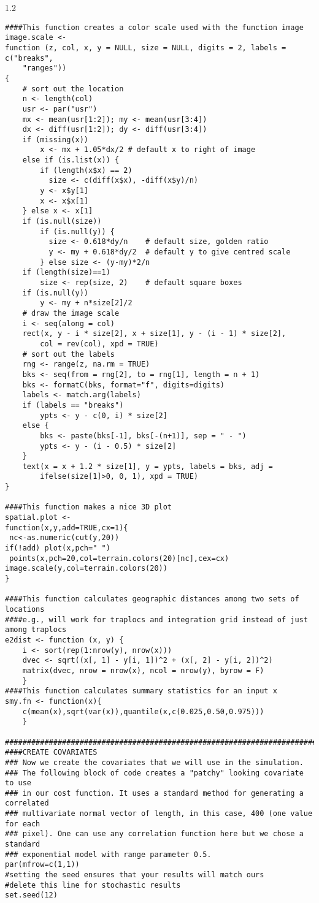 \documentclass[12pt]{article}
\begin{document}
\begin{spacing}{1.2}
{\begin{verbatim}
####This function creates a color scale used with the function image
image.scale <-
function (z, col, x, y = NULL, size = NULL, digits = 2, labels = c("breaks", 
    "ranges"))
{
    # sort out the location
    n <- length(col)
    usr <- par("usr")
    mx <- mean(usr[1:2]); my <- mean(usr[3:4])
    dx <- diff(usr[1:2]); dy <- diff(usr[3:4])
    if (missing(x))
        x <- mx + 1.05*dx/2	# default x to right of image
    else if (is.list(x)) {
        if (length(x$x) == 2) 
          size <- c(diff(x$x), -diff(x$y)/n)
        y <- x$y[1]
        x <- x$x[1]
    } else x <- x[1]
    if (is.null(size))
        if (is.null(y)) {
          size <- 0.618*dy/n	# default size, golden ratio
          y <- my + 0.618*dy/2	# default y to give centred scale
        } else size <- (y-my)*2/n
    if (length(size)==1)
        size <- rep(size, 2)	# default square boxes
    if (is.null(y))
        y <- my + n*size[2]/2
    # draw the image scale
    i <- seq(along = col)
    rect(x, y - i * size[2], x + size[1], y - (i - 1) * size[2], 
        col = rev(col), xpd = TRUE)
    # sort out the labels
    rng <- range(z, na.rm = TRUE)
    bks <- seq(from = rng[2], to = rng[1], length = n + 1)
    bks <- formatC(bks, format="f", digits=digits)
    labels <- match.arg(labels)
    if (labels == "breaks")
        ypts <- y - c(0, i) * size[2]
    else {
        bks <- paste(bks[-1], bks[-(n+1)], sep = " - ")
        ypts <- y - (i - 0.5) * size[2]
    }
    text(x = x + 1.2 * size[1], y = ypts, labels = bks, adj =
        ifelse(size[1]>0, 0, 1), xpd = TRUE) 
}

####This function makes a nice 3D plot
spatial.plot <-
function(x,y,add=TRUE,cx=1){
 nc<-as.numeric(cut(y,20))
if(!add) plot(x,pch=" ")
 points(x,pch=20,col=terrain.colors(20)[nc],cex=cx)
image.scale(y,col=terrain.colors(20))
}

####This function calculates geographic distances among two sets of locations 
####e.g., will work for traplocs and integration grid instead of just among traplocs 
e2dist <- function (x, y) {
    i <- sort(rep(1:nrow(y), nrow(x)))
    dvec <- sqrt((x[, 1] - y[i, 1])^2 + (x[, 2] - y[i, 2])^2)
    matrix(dvec, nrow = nrow(x), ncol = nrow(y), byrow = F)
    }
####This function calculates summary statistics for an input x
smy.fn <- function(x){
    c(mean(x),sqrt(var(x)),quantile(x,c(0.025,0.50,0.975)))
    }

##########################################################################
####CREATE COVARIATES
### Now we create the covariates that we will use in the simulation.
### The following block of code creates a "patchy" looking covariate to use
### in our cost function. It uses a standard method for generating a correlated
### multivariate normal vector of length, in this case, 400 (one value for each
### pixel). One can use any correlation function here but we chose a standard
### exponential model with range parameter 0.5.
par(mfrow=c(1,1))
#setting the seed ensures that your results will match ours 
#delete this line for stochastic results
set.seed(12)  


\end{verbatim}}
\end{spacing}
\end{document}
